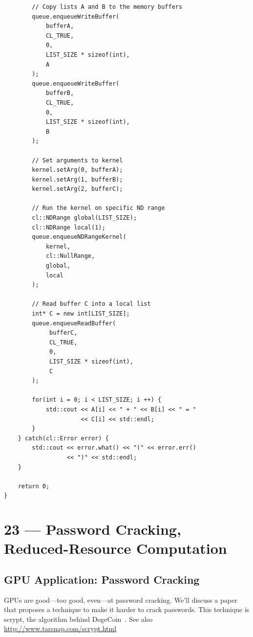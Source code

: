 \documentclass[a4paper]{report}
\begin{document}
\begin{lstlisting}
        // Copy lists A and B to the memory buffers
        queue.enqueueWriteBuffer(
            bufferA,
            CL_TRUE,
            0,
            LIST_SIZE * sizeof(int),
            A
        );
        queue.enqueueWriteBuffer(
            bufferB,
            CL_TRUE,
            0,
            LIST_SIZE * sizeof(int),
            B
        );
 
        // Set arguments to kernel
        kernel.setArg(0, bufferA);
        kernel.setArg(1, bufferB);
        kernel.setArg(2, bufferC);

        // Run the kernel on specific ND range
        cl::NDRange global(LIST_SIZE);
        cl::NDRange local(1);
        queue.enqueueNDRangeKernel(
            kernel,
            cl::NullRange,
            global,
            local
        );
 
        // Read buffer C into a local list
        int* C = new int[LIST_SIZE];
        queue.enqueueReadBuffer(
             bufferC,
             CL_TRUE,
             0,
             LIST_SIZE * sizeof(int),
             C
        );

        for(int i = 0; i < LIST_SIZE; i ++) {
            std::cout << A[i] << " + " << B[i] << " = "
                      << C[i] << std::endl;
        }
    } catch(cl::Error error) {
        std::cout << error.what() << "(" << error.err()
                  << ")" << std::endl;
    }
 
    return 0;
}
\end{lstlisting}









\chapter*{23 --- Password Cracking, Reduced-Resource Computation}


\section*{GPU Application: Password Cracking}

GPUs are good---too good, even---at password cracking. We'll discuss a paper
that proposes a technique to make it harder to crack passwords. This technique
is scrypt, the algorithm behind DogeCoin~\cite{scrypt}. See also \url{http://www.tarsnap.com/scrypt.html}
\end{document}
